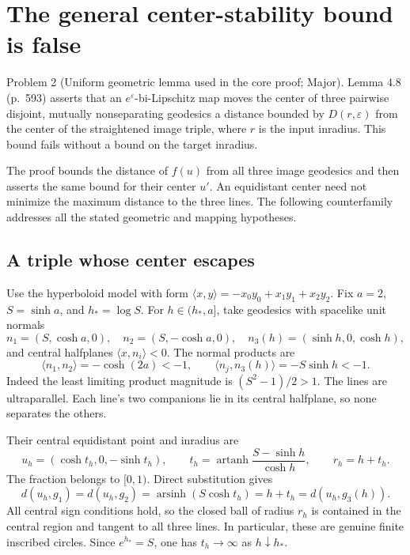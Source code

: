 \documentclass[10pt]{article}
\begin{document}
\section*{The general center-stability bound is false}
Problem 2 (Uniform geometric lemma used in the core proof; Major).  Lemma 4.8 (p. 593) asserts that an \(e^\varepsilon\)-bi-Lipschitz map moves the center of three pairwise disjoint, mutually nonseparating geodesics a distance bounded by \(D(r,\varepsilon)\) from the center of the straightened image triple, where \(r\) is the input inradius. This bound fails without a bound on the target inradius.\par
The proof bounds the distance of \(f(u)\) from all three image geodesics and then asserts the same bound for their center \(u'\). An equidistant center need not minimize the maximum distance to the three lines. The following counterfamily addresses all the stated geometric and mapping hypotheses.\par
\subsection*{A triple whose center escapes}
Use the hyperboloid model with form \(\langle x,y\rangle=-x_0y_0+x_1y_1+x_2y_2\). Fix \(a=2\), \(S=\sinh a\), and \(h_*=\log S\). For \(h\in(h_*,a]\), take geodesics with spacelike unit normals \[n_1=(S,\cosh a,0),\quad n_2=(S,-\cosh a,0),\quad
 n_3(h)=(\sinh h,0,\cosh h),\] and central halfplanes \(\langle x,n_i\rangle<0\). The normal products are \[\langle n_1,n_2\rangle=-\cosh(2a)<-1,\qquad
 \langle n_j,n_3(h)\rangle=-S\sinh h<-1.\] Indeed the least limiting product magnitude is \((S^2-1)/2>1\). The lines are ultraparallel. Each line’s two companions lie in its central halfplane, so none separates the others.\par
Their central equidistant point and inradius are \[u_h=(\cosh t_h,0,-\sinh t_h),\qquad
 t_h=\operatorname{artanh}\frac{S-\sinh h}{\cosh h},
 \qquad r_h=h+t_h .\] The fraction belongs to \([0,1)\). Direct substitution gives \[d(u_h,g_1)=d(u_h,g_2)
   =\operatorname{arsinh}(S\cosh t_h)=h+t_h=d(u_h,g_3(h)).\] All central sign conditions hold, so the closed ball of radius \(r_h\) is contained in the central region and tangent to all three lines. In particular, these are genuine finite inscribed circles. Since \(e^{h_*}=S\), one has \(t_h\to\infty\) as \(h\downarrow h_*\).\par
\end{document}
